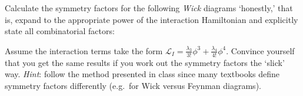\documentclass[12pt]{article}
\begin{document}
\begin{enumerate}
Calculate the symmetry factors for the following \textit{Wick} diagrams `honestly,' that is, expand to the appropriate power of the interaction Hamiltonian and explicitly state all combinatorial factors:
%
\begin{figure}[H]
  \centering
\end{figure}
%
Assume the interaction terms take the form $\mathcal L_I = \frac{\lambda_3}{3!} \phi^3 + \frac{\lambda_4}{4!} \phi^4$.
Convince yourself that you get the same results if you work out the symmetry factors the `slick' way. \textit{Hint}: follow the method presented in class since many textbooks define symmetry factors differently (e.g.\ for Wick versus Feynman diagrams). 



\end{enumerate}
\end{document}
